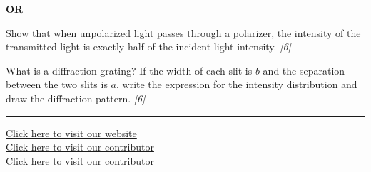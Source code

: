 \documentclass[11pt,a4paper]{article}
\newcommand{\pts}[1]{\hfill   \textit{[#1]}}
\begin{document}
\hfill   \textbf{OR}


\begin{parts}
  \item Show that when unpolarized light passes through a polarizer, the intensity of the transmitted light is exactly half of the incident light intensity. \pts{6}
  \item What is a diffraction grating? If the width of each slit is $b$ and the separation between the two slits is $a$, write the expression for the intensity distribution and draw the diffraction pattern. \pts{6}
\end{parts}

\vfill
\rule{\linewidth}{0.4pt}

\begin{center}\small
  \href{https://bhu-exam.vercel.app/}{Click here to visit our website}\\[4pt]\href{https://me-aryan.vercel.app/}{Click here to visit our contributor}\\[4pt]\href{https://quashan-me.vercel.app/}{Click here to visit our contributor}
\end{center}
\end{document}
